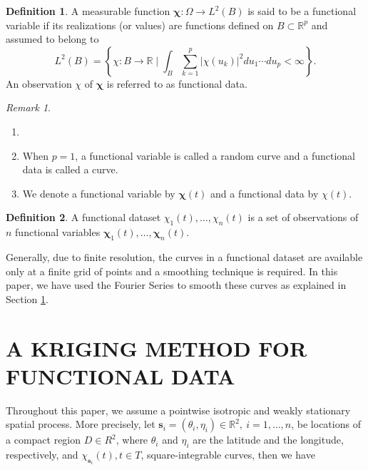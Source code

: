 \documentclass[
  12pt,
]{article}
\theoremstyle{definition}
\newtheorem{definition}{Definition}[section]
\theoremstyle{definition}
\theoremstyle{definition}
\theoremstyle{remark}
\newtheorem*{remark}{Remark}
\begin{document}
\begin{definition}
\protect\hypertarget{def:unnamed-chunk-1}{}{\label{def:unnamed-chunk-1} }A measurable function \(\bm{\chi}: \Omega \rightarrow L^2(B)\) is said to be a functional variable if its realizations (or values) are functions defined on \(B \subset \mathbb{R}^ p\) and assumed to belong to
\[
    L^2(B) = \left\{\chi:B \longrightarrow \mathbb{R} \mid \int_B \sum_{k=1}^{p} \lvert \chi(u_k) \rvert^2 du_1\cdots du_p < \infty \right\}.
\]
An observation \(\chi\) of \(\bm{\chi}\) is referred to as functional data.
\end{definition}

\begin{remark}
{}

\begin{enumerate}
  \item[]
  \item When $p = 1$, a functional variable is called a random curve and a functional data is called a curve.
  \item We denote a functional variable by $\bm{\chi}(t)$ and a functional data by $\chi(t)$.
\end{enumerate}
\end{remark}

\begin{definition}
\protect\hypertarget{def:unnamed-chunk-3}{}{\label{def:unnamed-chunk-3} }A functional dataset \(\chi_1(t), \dots, \chi_n(t)\) is a set of observations of \(n\) functional variables \(\bm{\chi}_1(t), \dots, \bm{\chi}_n(t)\).
\end{definition}

Generally, due to finite resolution, the curves in a functional dataset are available only at a finite grid of points and a smoothing technique is required.
In this paper, we have used the Fourier Series to smooth these curves as explained in Section \ref{sec:kriging}.

\hypertarget{sec:kriging}{%
\section{A KRIGING METHOD FOR FUNCTIONAL DATA}\label{sec:kriging}}

Throughout this paper, we assume a pointwise isotropic and weakly stationary spatial process. More precisely, let \(\bm{s}_i = (\theta_i, \eta_i) \in \mathbb{R}^2,\ i = 1, \dots, n\), be locations of a compact region \(D \in R^2\), where \(\theta_i\) and \(\eta_i\) are the latitude and the longitude, respectively, and \(\chi_{\bm{s}_i}(t), t \in T\), square-integrable curves, then we have
\end{document}
